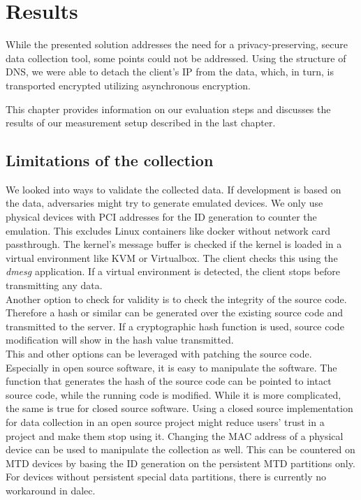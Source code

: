 \chapter{Results}
\label{chap:results}

While the presented solution addresses the need for a privacy-preserving, secure data collection tool, some points could not be addressed. 
Using the structure of DNS, we were able to detach the client's IP from the data, which, in turn, is transported encrypted utilizing asynchronous encryption. 

This chapter provides information on our evaluation steps and discusses the results of our measurement setup described in the last chapter.\\

\section{Limitations of the collection}
\label{sec:measurement:robust}
%

    We looked into ways to validate the collected data. If development is based on the data, adversaries might try to generate emulated devices. We only use physical devices with PCI addresses for the ID generation to counter the emulation. This excludes Linux containers like docker without network card passthrough. The kernel's message buffer is checked if the kernel is loaded in a virtual environment like KVM or Virtualbox. The client checks this using the \textit{dmesg} application. 
    If a virtual environment is detected, the client stops before transmitting any data.\\
    
    Another option to check for validity is to check the integrity of the source code. Therefore a hash or similar can be generated over the existing source code and transmitted to the server.
    If a cryptographic hash function is used, source code modification will show in the hash value transmitted.\\
    This and other options can be leveraged with patching the source code. Especially in open source software, it is easy to manipulate the software. The function that generates the hash of the source code can be pointed to intact source code, while the running code is modified. While it is more complicated, the same is true for closed source software.
    Using a closed source implementation for data collection in an open source project might reduce users' trust in a project and make them stop using it.
    Changing the MAC address of a physical device can be used to manipulate the collection as well. This can be countered on MTD devices by basing the ID generation on the persistent MTD partitions only. For devices without persistent special data partitions, there is currently no workaround in dalec.\\
    
